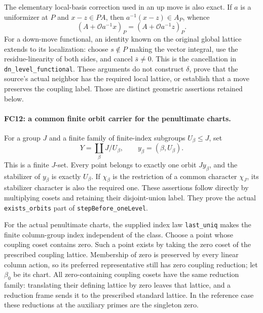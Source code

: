 The elementary local-basis correction used in an up move is also exact.
If $a$ is a uniformizer at $P$ and $x-z\in PA$, then
$a^{-1}(x-z)\in A_P$, whence
\[
 (A+\mathcal Oa^{-1}x)_P=(A+\mathcal Oa^{-1}z)_P.
 \tag{FC.22}
\]
For a down-move functional, an identity known on the original global
lattice extends to its localization: choose $s\notin P$ making the
vector integral, use the residue-linearity of both sides, and cancel
$\bar s\ne0$. This is the cancellation in
\texttt{dn\_level\_functional}. These arguments do not construct
$\delta$, prove that the source's actual neighbor has the required
local lattice, or establish that a move preserves the coupling label.
Those are distinct geometric assertions retained below.

\paragraph{FC12: a common finite orbit carrier for the penultimate
charts.}
For a group $J$ and a finite family of finite-index subgroups
$U_\beta\le J$, set
\[
 Y=\coprod_\beta J/U_\beta,\qquad y_\beta=(\beta,U_\beta).
 \tag{FC.23}
\]
This is a finite $J$-set. Every point belongs to exactly one orbit
$J y_\beta$, and the stabilizer of $y_\beta$ is exactly $U_\beta$.
If $\chi_\beta$ is the restriction of a common character $\chi_J$,
its stabilizer character is also the required one. These assertions
follow directly by multiplying cosets and retaining their disjoint-union
label. They prove the actual \texttt{exists\_orbits} part of
\texttt{stepBefore\_oneLevel}.

For the actual penultimate charts, the supplied index law
\texttt{last\_uniq} makes the finite column-group index independent
of the class. Choose a point whose coupling coset contains zero.
Such a point exists by taking the zero coset of the prescribed coupling
lattice. Membership of zero is preserved by every linear column action,
so its preferred representative still has zero coupling reduction;
let $\beta_0$ be its chart. All zero-containing coupling cosets have
the same reduction family: translating their defining lattice by zero
leaves that lattice, and a reduction frame sends it to the prescribed
standard lattice. In the reference case these reductions at the auxiliary
primes are the singleton zero.

